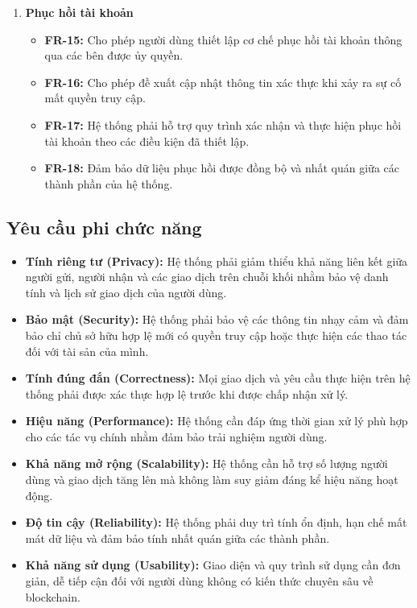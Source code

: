 \documentclass[../DoAn.tex]{subfiles}
\begin{document}
\begin{enumerate}
\item \textbf{Phục hồi tài khoản}
\begin{itemize}
\item \textbf{FR-15:} Cho phép người dùng thiết lập cơ chế phục hồi tài khoản thông qua các bên được ủy quyền.
\item \textbf{FR-16:} Cho phép đề xuất cập nhật thông tin xác thực khi xảy ra sự cố mất quyền truy cập.
\item \textbf{FR-17:} Hệ thống phải hỗ trợ quy trình xác nhận và thực hiện phục hồi tài khoản theo các điều kiện đã thiết lập.
\item \textbf{FR-18:} Đảm bảo dữ liệu phục hồi được đồng bộ và nhất quán giữa các thành phần của hệ thống.
\end{itemize}

\end{enumerate}

\subsection{Yêu cầu phi chức năng}

\begin{itemize}

\item \textbf{Tính riêng tư (Privacy):}
Hệ thống phải giảm thiểu khả năng liên kết giữa người gửi, người nhận và các giao dịch trên chuỗi khối nhằm bảo vệ danh tính và lịch sử giao dịch của người dùng.

\item \textbf{Bảo mật (Security):}
Hệ thống phải bảo vệ các thông tin nhạy cảm và đảm bảo chỉ chủ sở hữu hợp lệ mới có quyền truy cập hoặc thực hiện các thao tác đối với tài sản của mình.

\item \textbf{Tính đúng đắn (Correctness):}
Mọi giao dịch và yêu cầu thực hiện trên hệ thống phải được xác thực hợp lệ trước khi được chấp nhận xử lý.

\item \textbf{Hiệu năng (Performance):}
Hệ thống cần đáp ứng thời gian xử lý phù hợp cho các tác vụ chính nhằm đảm bảo trải nghiệm người dùng.

\item \textbf{Khả năng mở rộng (Scalability):}
Hệ thống cần hỗ trợ số lượng người dùng và giao dịch tăng lên mà không làm suy giảm đáng kể hiệu năng hoạt động.

\item \textbf{Độ tin cậy (Reliability):}
Hệ thống phải duy trì tính ổn định, hạn chế mất mát dữ liệu và đảm bảo tính nhất quán giữa các thành phần.

\item \textbf{Khả năng sử dụng (Usability):}
Giao diện và quy trình sử dụng cần đơn giản, dễ tiếp cận đối với người dùng không có kiến thức chuyên sâu về blockchain.

\end{itemize}
\end{document}
